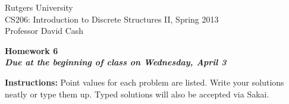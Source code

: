 \documentclass[11pt]{article}
\begin{document}
\sloppy

\noindent Rutgers University\\
CS206: Introduction to Discrete Structures II, Spring 2013\\
Professor David Cash\\

\begin{center}
\LARGE{\textbf{Homework 6}}\\
\large{\textbf{\emph{Due at the beginning of class on Wednesday, April 3}}}
\end{center}

\vspace{.1in}

\noindent\textbf{Instructions:} Point values for each problem are listed.
Write your solutions neatly or type them up.  Typed solutions will also be
accepted via Sakai.
\end{document}
